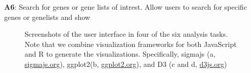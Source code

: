 \textbf{A6}: Search for genes or gene lists of intrest. Allow users to search
for specific genes or genelists and show 

\begin{figure}[!t]
\centering
{}
\hfil
{}
\hfil
\centering
{}
\hfil
{}
\caption{Screenshots of the user interface in four of the six analysis tasks.
Note that we combine visualization frameworks for both JavaScript and R to
generate the visualizations. Specifically,
sigmajs (a, \protect\url{sigmajs.org}), ggplot2(b, \protect\url{ggplot2.org}), and 
D3 (c and d, \protect\url{d3js.org})} 
\label{fig_sim}
\end{figure}


